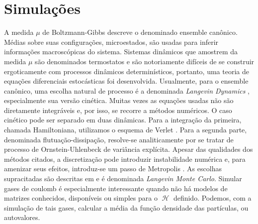 \documentclass[11pt,twocolumn]{article}
\DeclareMathOperator{\Hf}{\mathcal{H}}
\numberwithin{equation}{section} %
\begin{document}
\section{Simulações}
A medida $\mu$ de Boltzmann-Gibbs descreve o denominado ensemble canônico. Médias sobre suas configurações, microestados, são usadas para inferir informações macroscópicas do sistema. Sistemas dinâmicos que amostrem da medida $\mu$ são denominados termostatos e são notoriamente difíceis de se construir ergoticamente com processos dinâmicos determinísticos, portanto, uma teoria de equações diferenciais estocásticas foi desenvolvida. Usualmente, para o ensemble canônico, uma escolha natural de processo é a denominada \textit{Langevin Dynamics} \cite[Capítulo~6]{leimmolecular}, especialmente sua versão cinética. Muitas vezes as equações usadas não são diretamente integráveis e, por isso, se recorre a métodos numéricos. O caso cinético pode ser separado em duas dinâmicas. Para a integração da primeira, chamada Hamiltoniana, utilizamos o esquema de Verlet \cite{Verlet}. Para a segunda parte, denominada flutuação-dissipação, resolve-se analiticamente por se tratar de processo de Ornstein-Uhlenbeck de variância explícita. Apesar das qualidades dos métodos citados, a discretização pode introduzir instabilidade numérica e, para amenizar seus efeitos, introduz-se um passo de Metropolis \cite[Apêndice~C]{leimmolecular}. As escolhas supracitadas são descritas em \cite{Chafa2018} e é denominada \textit{Langevin Monte Carlo}. Simular gases de coulomb é especialmente interessante quando não há modelos de matrizes conhecidos, disponíveis ou simples para o $\Hf$ definido. Podemos, com a simulação de tais gases, calcular a média da função densidade das partículas, ou autovalores.
\end{document}
